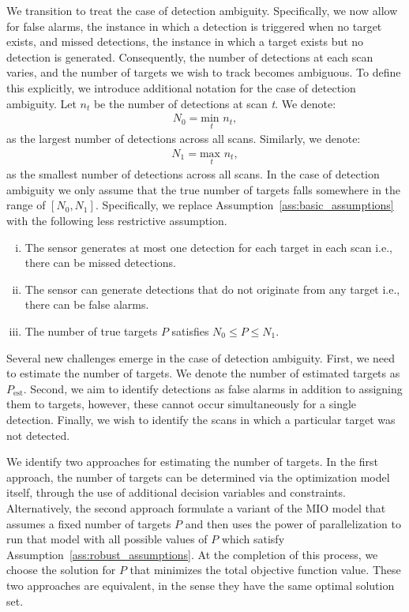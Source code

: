We transition to treat the case of detection ambiguity. Specifically, we now allow for false alarms, the instance in which a detection is triggered when no target exists, and missed detections, the instance in which a target exists but no detection is generated. Consequently, the number of detections at each scan varies, and the number of targets we wish to track becomes ambiguous. To define this explicitly, we introduce additional notation for the case of detection ambiguity. Let $n_{t}$ be the number of detections at scan \textit{t}. We denote:
\begin{align*}
N_{0} = \underset{t}{\text{min }} n_{t},
\end{align*}
as the largest number of detections across all scans. Similarly, we denote:
\begin{align*}
N_{1} = \underset{t}{\text{max }}  n_{t},
\end{align*}
as the smallest number of detections across all scans. In the case of detection ambiguity we only assume that the true number of targets falls somewhere in the range of $[N_{0},N_{1}]$. Specifically, we replace Assumption~\ref{ass:basic_assumptions} with the following less restrictive assumption.
\begin{assumption}\label{ass:robust_assumptions}
\leavevmode
\begin{enumerate}[(i)]
\item The sensor generates at most one detection for each target in each scan i.e., there can be missed detections.
\item The sensor can generate detections that do not originate from any target i.e., there can be false alarms.
\item The number of true targets $P$ satisfies $N_0\leq P \leq N_1$.
\end{enumerate}
\end{assumption}

Several new challenges emerge in the case of detection ambiguity. First, we need to estimate the number of targets. We denote the number of estimated targets as $P_{\text{est}}$. Second, we aim to identify detections as false alarms in addition to assigning them to targets, however, these cannot occur simultaneously for a single detection. Finally, we wish to identify the scans in which a particular target was not detected. 

We identify two approaches for estimating the number of targets. In the first approach, the number of targets can be determined via the optimization model itself, through the use of additional decision variables and constraints. Alternatively, the second approach formulate a variant of the MIO model that assumes a fixed number of targets $P$ and then uses the power of parallelization to run that model with all possible values of $P$ which satisfy Assumption~\ref{ass:robust_assumptions}. At the completion of this process, we choose the solution for $P$ that minimizes the total objective function value. These two approaches are equivalent, in the sense they have the same optimal solution set.  


